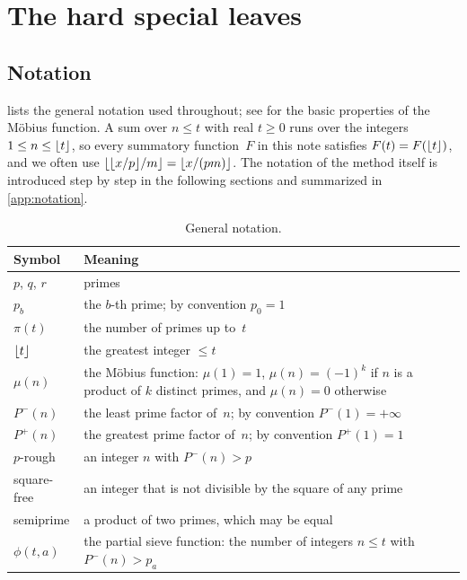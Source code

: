\documentclass[11pt,a4paper]{amsart}
\numberwithin{equation}{section}
\DeclarePairedDelimiter{\floor}{\lfloor}{\rfloor}
\newcommand{\Pminus}{P^{-}}
\newcommand{\Pplus}{P^{+}}
\begin{document}
\section{The hard special leaves}\label{sec:leaves}

\subsection{Notation}
 lists the general notation used throughout; see
\cite[Ch.~2]{Apostol1976} for the basic properties of the M\"obius function. A
sum over $n\le t$ with real $t\ge0$ runs over the integers $1\le n\le\floor{t}$,
so every summatory function~$F$ in this note satisfies $F(t)=F(\floor{t})$, and
we often use $\floor{\floor{x/p}/m}=\floor{x/(pm)}$. The notation of the method
itself is introduced step by step in the following sections and summarized in
\cref{app:notation}.

\begin{table}[htb]
\caption{General notation.}\label{tab:notation}
\centering
\begin{tabular}{@{}l>{\raggedright\arraybackslash}p{110mm}@{}}
\toprule
Symbol & Meaning\\
\midrule
$p$, $q$, $r$ & primes\\
$p_b$ & the $b$-th prime; by convention $p_0=1$\\
$\pi(t)$ & the number of primes up to~$t$\\
$\floor{t}$ & the greatest integer $\le t$\\
$\mu(n)$ & the M\"obius function: $\mu(1)=1$, $\mu(n)=(-1)^k$ if $n$ is a product
  of $k$ distinct primes, and $\mu(n)=0$ otherwise\\
$\Pminus(n)$ & the least prime factor of~$n$; by convention $\Pminus(1)=+\infty$\\
$\Pplus(n)$ & the greatest prime factor of~$n$; by convention $\Pplus(1)=1$\\
$p$-rough & an integer $n$ with $\Pminus(n)>p$\\
square-free & an integer that is not divisible by the square of any prime\\
semiprime & a product of two primes, which may be equal\\
$\phi(t,a)$ & the partial sieve function: the number of integers $n\le t$ with
  $\Pminus(n)>p_a$\\
\bottomrule
\end{tabular}
\end{table}
\end{document}
